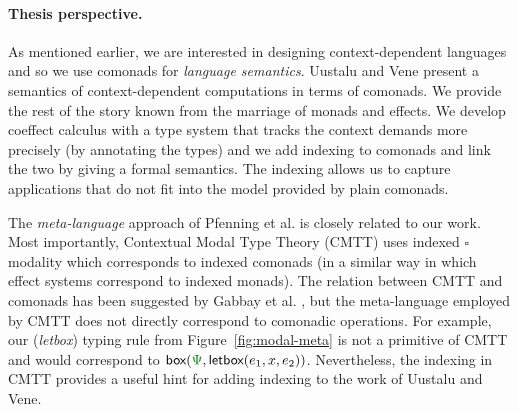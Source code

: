 
\paragraph{Thesis perspective.}
As mentioned earlier, we are interested in designing context-dependent languages and so we
use comonads for \emph{language semantics}. Uustalu and Vene present a semantics of
context-dependent computations in terms of comonads. We provide the rest of the story known
from the marriage of monads and effects. We develop coeffect calculus with a type system that
tracks the context demands more precisely (by annotating the types) and we add indexing
to comonads and link the two by giving a formal semantics. The indexing allows us to capture
applications that do not fit into the model provided by plain comonads.

The \emph{meta-language} approach of Pfenning et al. is closely related to
our work. Most importantly, Contextual Modal Type Theory (CMTT) uses indexed $\square$ modality
which corresponds to indexed comonads (in a similar way in which effect systems correspond to
indexed monads). The relation between CMTT and comonads has been suggested by
Gabbay et al. \cite{logic-cmtt-semantics}, but the meta-language employed by CMTT does not
directly correspond to comonadic operations. For example, our (\emph{letbox}) typing rule from
Figure~\ref{fig:modal-meta} is not a primitive of CMTT and would correspond to
$\ident{box}(\cclrd{\Psi}, \ident{letbox}(e_1, x, e_2))$. Nevertheless, the indexing in
CMTT provides a useful hint for adding indexing to the work of Uustalu and Vene.


%
%

